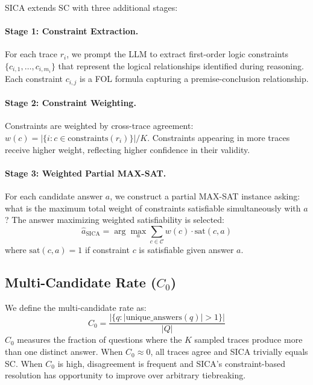 \documentclass[11pt,a4paper]{article}
\begin{document}
SICA extends SC with three additional stages:

\paragraph{Stage 1: Constraint Extraction.}
For each trace $r_i$, we prompt the LLM to extract first-order logic constraints $\{c_{i,1}, \ldots, c_{i,m_i}\}$ that represent the logical relationships identified during reasoning. Each constraint $c_{i,j}$ is a FOL formula capturing a premise-conclusion relationship.

\paragraph{Stage 2: Constraint Weighting.}
Constraints are weighted by cross-trace agreement: $w(c) = |\{i : c \in \text{constraints}(r_i)\}| / K$. Constraints appearing in more traces receive higher weight, reflecting higher confidence in their validity.

\paragraph{Stage 3: Weighted Partial MAX-SAT.}
For each candidate answer $a$, we construct a partial MAX-SAT instance asking: what is the maximum total weight of constraints satisfiable simultaneously with $a$? The answer maximizing weighted satisfiability is selected:
\begin{equation}
\hat{a}_{\text{SICA}} = \arg\max_a \sum_{c \in \mathcal{C}} w(c) \cdot \text{sat}(c, a)
\end{equation}
where $\text{sat}(c, a) = 1$ if constraint $c$ is satisfiable given answer $a$.

\subsection{Multi-Candidate Rate ($C_0$)}

We define the multi-candidate rate as:
\begin{equation}
C_0 = \frac{|\{q : |\text{unique\_answers}(q)| > 1\}|}{|Q|}
\end{equation}
$C_0$ measures the fraction of questions where the $K$ sampled traces produce more than one distinct answer. When $C_0 \approx 0$, all traces agree and SICA trivially equals SC. When $C_0$ is high, disagreement is frequent and SICA's constraint-based resolution has opportunity to improve over arbitrary tiebreaking.
\end{document}

